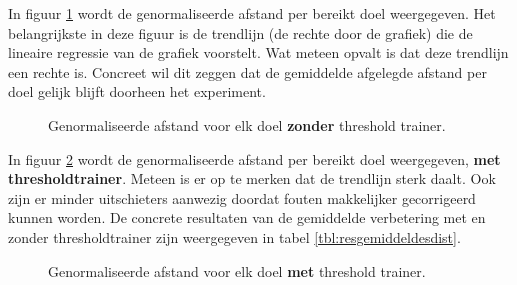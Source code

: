 \documentclass{article}
\newcommand{\figwidth}{0.85\linewidth}
\begin{document}
In figuur \ref{fig:resdistnt} wordt de genormaliseerde afstand per bereikt doel weergegeven. Het belangrijkste in deze figuur is de trendlijn (de rechte door de grafiek) die de lineaire regressie van de grafiek voorstelt. Wat meteen opvalt is dat deze trendlijn een rechte is. Concreet wil dit zeggen dat de gemiddelde afgelegde afstand per doel gelijk blijft doorheen het experiment.\\
\begin{figure}[H]
	\centering
	\caption{Genormaliseerde afstand voor elk doel \textbf{zonder} threshold trainer.}
	\label{fig:resdistnt}
\end{figure}
In figuur \ref{fig:resdistwt} wordt de genormaliseerde afstand per bereikt doel weergegeven, \textbf{met thresholdtrainer}. Meteen is er op te merken dat de trendlijn sterk daalt. Ook zijn er minder uitschieters aanwezig doordat fouten makkelijker gecorrigeerd kunnen worden. De concrete resultaten van de gemiddelde verbetering met en zonder thresholdtrainer zijn weergegeven in tabel \ref{tbl:resgemiddeldesdist}.
\begin{figure}[H]
	\centering
	\caption{Genormaliseerde afstand voor elk doel \textbf{met} threshold trainer.}
	\label{fig:resdistwt}
	
\end{figure}
\end{document}
